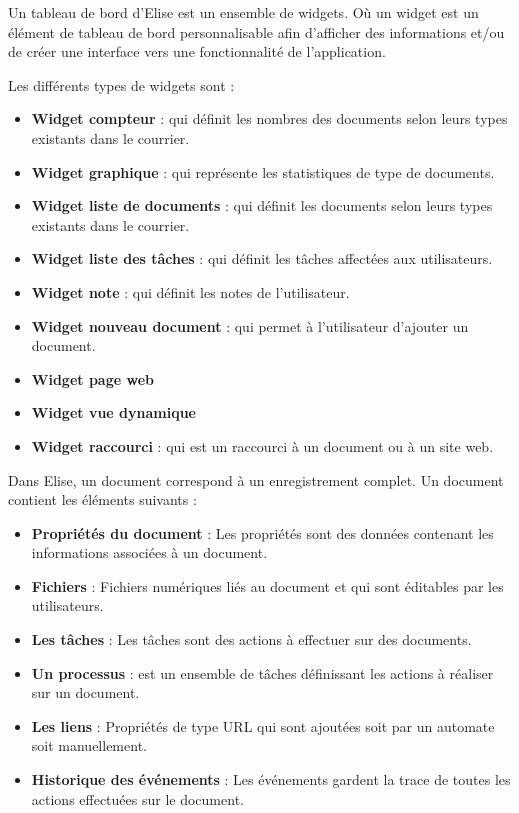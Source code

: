 Un tableau de bord d'Elise est un ensemble de widgets. Où un widget est un élément de tableau de bord personnalisable afin d'afficher des informations et/ou de créer une interface vers une fonctionnalité de l'application.

Les différents types de widgets sont :

\begin{itemize}

\item \textbf{Widget compteur} : qui définit les nombres des documents selon leurs types existants dans le courrier.
\item \textbf{Widget graphique} : qui représente les statistiques de type de documents.
\item \textbf{Widget liste de documents} : qui définit les documents selon leurs types existants dans le courrier.
\item \textbf{Widget liste des tâches} : qui définit les tâches affectées aux utilisateurs.
\item \textbf{Widget note} : qui définit les notes de l'utilisateur.
\item \textbf{Widget nouveau document} : qui permet à l'utilisateur d'ajouter un document.
\item \textbf{Widget page web}
\item \textbf{Widget vue dynamique}
\item \textbf{Widget raccourci} : qui est un raccourci à un document ou à un site web.

\end{itemize}

Dans Elise, un document correspond à un enregistrement complet. Un document contient les éléments suivants :

\begin{itemize}
\item \textbf{Propriétés du document} : Les propriétés sont des données contenant les informations associées à un document.
\item \textbf{Fichiers} : Fichiers numériques liés au document et qui sont éditables par les utilisateurs.
\item \textbf{Les tâches} : Les tâches sont des actions à effectuer sur des documents.
\item \textbf{Un processus} : est un ensemble de tâches définissant les actions à réaliser sur un document.
\item \textbf{Les liens} : Propriétés de type URL qui sont ajoutées soit par un automate soit manuellement.
\item \textbf{Historique des événements} : Les événements gardent la trace de toutes les actions effectuées sur le document.
\end{itemize}

